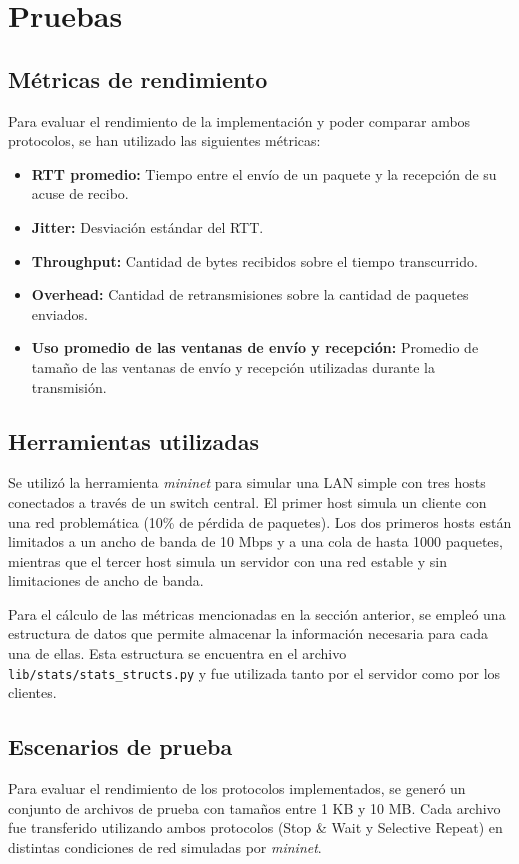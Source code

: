 \section{Pruebas}
\subsection{Métricas de rendimiento}
Para evaluar el rendimiento de la implementación y poder comparar ambos protocolos, se han utilizado las siguientes métricas:
\begin{itemize}
    \item \textbf{RTT promedio:} Tiempo entre el envío de un paquete y la recepción de su acuse de recibo.
    \item \textbf{Jitter:} Desviación estándar del RTT.
    \item \textbf{Throughput:} Cantidad de bytes recibidos sobre el tiempo transcurrido.
    \item \textbf{Overhead:} Cantidad de retransmisiones sobre la cantidad de paquetes enviados.
    \item \textbf{Uso promedio de las ventanas de envío y recepción:} Promedio de tamaño de las ventanas de envío y recepción utilizadas durante la transmisión.
\end{itemize}
\subsection{Herramientas utilizadas}
Se utilizó la herramienta \textit{mininet} para simular una LAN simple con tres hosts conectados a través de un switch central. El primer host simula un cliente con una red problemática (10\% de pérdida de paquetes). Los dos primeros hosts están limitados a un ancho de banda de 10 Mbps y a una cola de hasta 1000 paquetes, mientras que el tercer host simula un servidor con una red estable y sin limitaciones de ancho de banda.

Para el cálculo de las métricas mencionadas en la sección anterior, se empleó una estructura de datos que permite almacenar la información necesaria para cada una de ellas. Esta estructura se encuentra en el archivo \texttt{lib/stats/stats\_structs.py} y fue utilizada tanto por el servidor como por los clientes.

\subsection{Escenarios de prueba}
Para evaluar el rendimiento de los protocolos implementados, se generó un conjunto de archivos de prueba con tamaños entre 1 KB y 10 MB. Cada archivo fue transferido utilizando ambos protocolos (Stop \& Wait y Selective Repeat) en distintas condiciones de red simuladas por \textit{mininet}.

